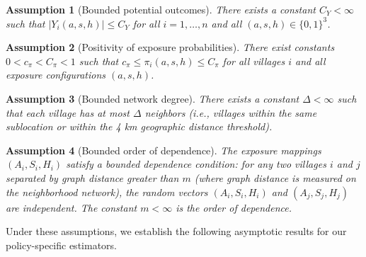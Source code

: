\documentclass{article}
\newtheorem{assumption}{Assumption}
\newcommand{\pscore}[1]{\pi_{#1}}
\begin{document}
\begin{assumption}[Bounded potential outcomes]\label{ass:bounded}
There exists a constant $C_Y < \infty$ such that $|Y_i(a,s,h)| \leq C_Y$ for all $i = 1, \ldots, n$ and all $(a,s,h) \in \{0,1\}^3$.
\end{assumption}

\begin{assumption}[Positivity of exposure probabilities]\label{ass:positivity}
There exist constants $0 < c_{\pi} < C_{\pi} < 1$ such that $c_{\pi} \leq \pscore{i}(a,s,h) \leq C_{\pi}$ for all villages $i$ and all exposure configurations $(a,s,h)$.
\end{assumption}

\begin{assumption}[Bounded network degree]\label{ass:degree}
There exists a constant $\Delta < \infty$ such that each village has at most $\Delta$ neighbors (i.e., villages within the same sublocation or within the 4 km geographic distance threshold).
\end{assumption}

\begin{assumption}[Bounded order of dependence]\label{ass:dependence}
The exposure mappings $(A_i, S_i, H_i)$ satisfy a bounded dependence condition: for any two villages $i$ and $j$ separated by graph distance greater than $m$ (where graph distance is measured on the neighborhood network), the random vectors $(A_i, S_i, H_i)$ and $(A_j, S_j, H_j)$ are independent. The constant $m < \infty$ is the order of dependence.
\end{assumption}

Under these assumptions, we establish the following asymptotic results for our policy-specific estimators.
\end{document}
